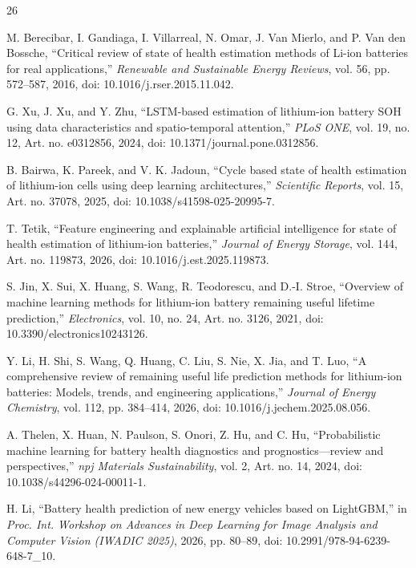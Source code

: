 \documentclass[conference]{IEEEtran}
\begin{document}
\begin{thebibliography}{26}

 M. Berecibar, I. Gandiaga, I. Villarreal, N. Omar, J. Van Mierlo, and P. Van den Bossche, ``Critical review of state of health estimation methods of Li-ion batteries for real applications,'' \emph{Renewable and Sustainable Energy Reviews}, vol. 56, pp. 572--587, 2016, doi: 10.1016/j.rser.2015.11.042.

 G. Xu, J. Xu, and Y. Zhu, ``LSTM-based estimation of lithium-ion battery SOH using data characteristics and spatio-temporal attention,'' \emph{PLoS ONE}, vol. 19, no. 12, Art. no. e0312856, 2024, doi: 10.1371/journal.pone.0312856.

 B. Bairwa, K. Pareek, and V. K. Jadoun, ``Cycle based state of health estimation of lithium-ion cells using deep learning architectures,'' \emph{Scientific Reports}, vol. 15, Art. no. 37078, 2025, doi: 10.1038/s41598-025-20995-7.

 T. Tetik, ``Feature engineering and explainable artificial intelligence for state of health estimation of lithium-ion batteries,'' \emph{Journal of Energy Storage}, vol. 144, Art. no. 119873, 2026, doi: 10.1016/j.est.2025.119873.

 S. Jin, X. Sui, X. Huang, S. Wang, R. Teodorescu, and D.-I. Stroe, ``Overview of machine learning methods for lithium-ion battery remaining useful lifetime prediction,'' \emph{Electronics}, vol. 10, no. 24, Art. no. 3126, 2021, doi: 10.3390/electronics10243126.

 Y. Li, H. Shi, S. Wang, Q. Huang, C. Liu, S. Nie, X. Jia, and T. Luo, ``A comprehensive review of remaining useful life prediction methods for lithium-ion batteries: Models, trends, and engineering applications,'' \emph{Journal of Energy Chemistry}, vol. 112, pp. 384--414, 2026, doi: 10.1016/j.jechem.2025.08.056.

 A. Thelen, X. Huan, N. Paulson, S. Onori, Z. Hu, and C. Hu, ``Probabilistic machine learning for battery health diagnostics and prognostics---review and perspectives,'' \emph{npj Materials Sustainability}, vol. 2, Art. no. 14, 2024, doi: 10.1038/s44296-024-00011-1.

 H. Li, ``Battery health prediction of new energy vehicles based on LightGBM,'' in \emph{Proc. Int. Workshop on Advances in Deep Learning for Image Analysis and Computer Vision (IWADIC 2025)}, 2026, pp. 80--89, doi: 10.2991/978-94-6239-648-7\_10.


\end{thebibliography}
\end{document}
